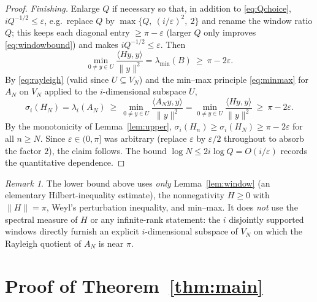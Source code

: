 \documentclass[12pt]{article}
\theoremstyle{remark}
\newtheorem*{remark}{Remark}
\begin{document}
\begin{proof}
\smallskip
\noindent\emph{Finishing.} Enlarge $Q$ if necessary so that, in addition to \eqref{eq:Qchoice},
$iQ^{-1/2}\le\varepsilon$, e.g.\ replace $Q$ by $\max\{Q,\ (i/\varepsilon)^2,\ 2\}$ and rename the
window ratio $Q$; this keeps each diagonal entry $\ge\pi-\varepsilon$ (larger $Q$ only improves
\eqref{eq:windowbound}) and makes $iQ^{-1/2}\le\varepsilon$. Then
\[
\min_{0\ne y\in U}\frac{\langle Hy,y\rangle}{\|y\|^2}=\lambda_{\min}(B)\ \ge\ \pi-2\varepsilon .
\]
By \eqref{eq:rayleigh} (valid since $U\subseteq V_N$) and the min--max principle \eqref{eq:minmax}
for $A_N$ on $V_N$ applied to the $i$-dimensional subspace $U$,
\[
\sigma_i(H_N)=\lambda_i(A_N)\ \ge\ \min_{0\ne y\in U}\frac{\langle A_N y,y\rangle}{\|y\|^2}
=\min_{0\ne y\in U}\frac{\langle Hy,y\rangle}{\|y\|^2}\ \ge\ \pi-2\varepsilon .
\]
By the monotonicity of Lemma~\ref{lem:upper}, $\sigma_i(H_n)\ge\sigma_i(H_N)\ge\pi-2\varepsilon$
for all $n\ge N$. Since $\varepsilon\in(0,\pi]$ was arbitrary (replace $\varepsilon$ by
$\varepsilon/2$ throughout to absorb the factor $2$), the claim follows. The bound
$\log N\le 2i\log Q=O(i/\varepsilon)$ records the quantitative dependence.
\end{proof}

\begin{remark}
The lower bound above uses \emph{only} Lemma~\ref{lem:window} (an elementary Hilbert-inequality
estimate), the nonnegativity $H\ge0$ with $\|H\|=\pi$, Weyl's perturbation inequality, and
min--max. It does \emph{not} use the spectral measure of $H$ or any infinite-rank statement: the
$i$ disjointly supported windows directly furnish an explicit $i$-dimensional subspace of $V_N$ on
which the Rayleigh quotient of $A_N$ is near $\pi$.
\end{remark}

\section{Proof of Theorem~\ref{thm:main}}
\end{document}
